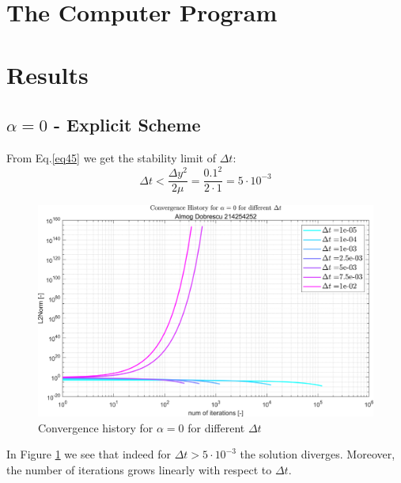 \documentclass[11pt, a4paper]{article}
\begin{document}
\section{The Computer Program}
\newpage

\section{Results}
\subsection{$\alpha = 0$ - Explicit Scheme}
From Eq.\ref{eq45} we get the stability limit of $\Delta t$:
\begin{equation}
    \Delta t < \frac{\Delta y^2}{2\mu} = \frac{0.1^2}{2\cdot1} = 5\cdot10^{-3}
\end{equation}
\begin{figure}[H]
    \centering
    \includegraphics[width=.8\textwidth]{images/grap1.png}
    \caption{Convergence history for $\alpha=0$ for different $\Delta t$}
    \label{fig1}
\end{figure}
\noindent In Figure \ref{fig1} we see that indeed for $\Delta t>5\cdot10^{-3}$ the solution diverges.
Moreover, the number of iterations grows linearly with respect to $\Delta t$.
\end{document}
